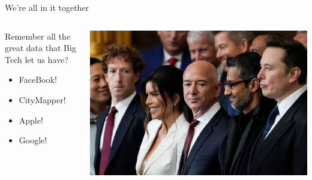 \documentclass[
  ignorenonframetext,
]{beamer}
\providecommand{\tightlist}{%
  \setlength{\itemsep}{0pt}\setlength{\parskip}{0pt}}\usepackage{longtable,booktabs,array}
\begin{document}
\begin{frame}{We're all in it together}
\label{were-all-in-it-together}
\begin{columns}[T]
\begin{column}{0.6\textwidth}
Remember all the great data that Big Tech let us have?

\begin{itemize}
\tightlist
\item
  FaceBook!
\item
  CityMapper!
\item
  Apple!
\item
  Google!
\end{itemize}
\end{column}

\begin{column}{0.4\textwidth}
\includegraphics{images/tech_knobs.jpeg}
\end{column}
\end{columns}
\end{frame}
\end{document}

